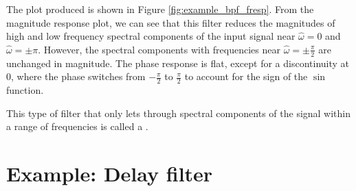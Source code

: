 The plot produced is shown in Figure \ref{fig:example_bpf_fresp}. From
the magnitude response plot, we can see that this filter reduces the
magnitudes of high and low frequency spectral components of the input
signal near $\hat{\omega}=0$ and $\hat{\omega}=\pm \pi$. However, the
spectral components with frequencies near
$\hat{\omega}=\pm \frac{\pi}{2}$ are unchanged in magnitude. The phase
response is flat, except for a discontinuity at 0, where
the phase switches from $-\frac{\pi}{2}$ to $\frac{\pi}{2}$ to account
for the sign of the $\sin$ function.

This type of filter that only lets through spectral components of
the signal within a range of frequencies is called a \emph{}.



\section{Example: Delay filter}

